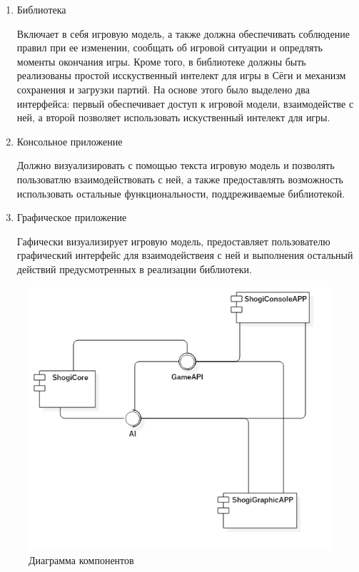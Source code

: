 \begin{enumerate}
	\item Библиотека
	
	 Включает в себя игровую модель, а также должна обеспечивать соблюдение правил при   	 ее изменении, сообщать об игровой ситуации и опредлять моменты окончания игры. 			 Кроме того, в библиотеке должны быть реализованы простой исскуственный интелект для      	 игры в Сёги и механизм сохранения и загрузки партий. На основе этого было выделено      	 два интерфейса: первый обеспечивает доступ к игровой модели, взаимодействе с ней, а второй позволяет использовать искуственный интелект для игры.
	 
	\item Консольное приложение
	
	Должно визуализировать с помощью текста игровую модель и позволять пользоватлю 				взаимодействовать с ней, а также предоставлять возможность использовать остальные 			функциональности, поддреживаемые библиотекой.
	
	\item Графическое приложение 

	Гафически визуализирует игровую модель, предоставляет пользователю графический интерфейс для взаимодействеия с ней и выполнения остальный действий предусмотренных в реализации библиотеки. 
\end{enumerate}

\begin{figure}[H]
	\begin{center}
		\includegraphics[scale=0.7]{../diagrams/ComponentDiagram1.png}
		\caption{Диаграмма компонентов}
		\label{pic:components}
	\end{center}
\end{figure}

